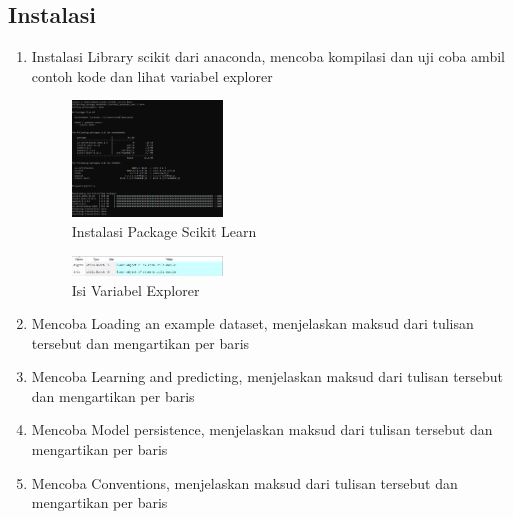 \subsection{Instalasi}
\begin{enumerate}
	\item Instalasi Library scikit dari anaconda, mencoba kompilasi dan uji coba ambil contoh kode dan lihat variabel explorer
	\hfill\break
	\begin{figure}[H]
		\includegraphics[width=4cm]{figures/1174080/1/1.PNG}
		\centering
		\caption{Instalasi Package Scikit Learn}
	\end{figure}
	\begin{figure}[H]
		\includegraphics[width=4cm]{figures/1174080/1/2.PNG}
		\centering
		\caption{Isi Variabel Explorer}
	\end{figure}
	\item Mencoba Loading an example dataset, menjelaskan maksud dari tulisan tersebut dan mengartikan           		  per baris
	\hfill\break
	
	\item Mencoba Learning and predicting, menjelaskan maksud dari tulisan tersebut dan mengartikan per  			  baris
	\hfill\break
	
	\item  Mencoba Model persistence, menjelaskan maksud dari tulisan tersebut dan mengartikan per baris
	\hfill\break
	
	\item Mencoba Conventions, menjelaskan maksud dari tulisan tersebut dan mengartikan per baris
	\hfill\break
	
\end{enumerate}


